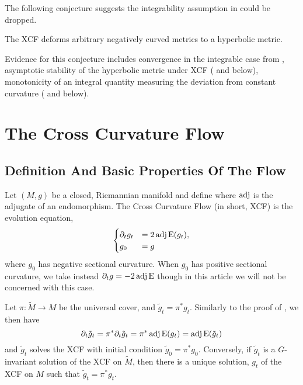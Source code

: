 \documentclass[a4paper,12pt]{amsart}
\begin{document}
The following conjecture suggests the integrability assumption in  could be dropped.

\begin{conj}[\cite{MR2055396}]
\label{conj:chow_hamilton}

The XCF deforms arbitrary negatively curved metrics to a hyperbolic metric.
\end{conj}

Evidence for this conjecture includes convergence in the integrable case from , asymptotic stability of the hyperbolic metric under XCF (\cite{MR2448593} and  below), monotonicity of an integral quantity measuring the deviation from constant curvature (\cite{MR2055396} and  below).

\section{The Cross Curvature Flow}
\label{sec:xcf}
\subsection{Definition And Basic Properties Of The Flow}
\label{subsec:xcf_defn}

Let \((M, g)\) be a closed, Riemannian manifold and define
where $\operatorname{adj}$ is the adjugate of an endomorphism. The Cross Curvature Flow (in short, XCF) is the evolution equation,
\begin{equation}
\label{eq:xcf}
\begin{cases}
\partial_t g_t  &= 2 \operatorname{adj}\operatorname{E}(g_t), \\
g_0 &= g
\end{cases}
\end{equation}
where \(g_0\) has negative sectional curvature. When \(g_0\) has positive sectional curvature, we take instead \(\partial_t g = -2\operatorname{adj}\operatorname{E}\) though in this article we will not be concerned with this case.
\begin{rem}
Let \(\pi : \tilde{M} \to M\) be the universal cover, and \(\tilde{g}_t = \pi^{\ast} g_t\). Similarly to the proof of , we then have
\[
\partial_t \tilde{g}_t = \pi^{\ast} \partial_t \tilde{g}_t = \pi^{\ast} \operatorname{adj}\operatorname{E}(g_t) = \operatorname{adj}\operatorname{E}(\tilde{g}_t)
\]
and \(\tilde{g}_t\) solves the XCF with initial condition \(\tilde{g}_0 = \pi^{\ast} g_0\). Conversely, if \(\tilde{g}_t\) is a \(G\)-invariant solution of the XCF on \(\tilde{M}\), then there is a unique solution, \(g_t\) of the XCF on \(M\) such that \(\tilde{g}_t = \pi^{\ast} g_t\).
\end{rem}
\end{document}
